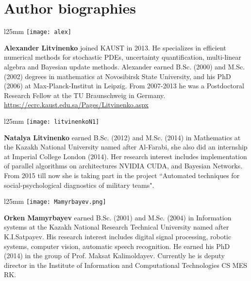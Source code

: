 \documentclass[12pt]{article}
\let\oldurl\url
\let\linkurl\url
\let\url\oldurl
\begin{document}
\section*{Author biographies}
\begin{wrapfigure}{l}{25mm} 
\texttt{[image: alex]}\end{wrapfigure}\par
{\bf Alexander Litvinenko} joined KAUST in 2013. He specializes in efficient numerical methods for stochastic PDEs, uncertainty quantification, multi-linear algebra and Bayesian update methods. Alexander earned B.Sc. (2000) and M.Sc. (2002) degrees in mathematics at Novosibirsk State University, and his PhD (2006) at Max-Planck-Institut in Leipzig. From 2007-2013 he was a Postdoctoral Research Fellow at the TU Braunschweig in Germany.\\
\linkurl{https://ecrc.kaust.edu.sa/Pages/Litvinenko.aspx}\\

\begin{wrapfigure}{l}{25mm} 
\texttt{[image: litvinenkoN1]}\end{wrapfigure}\par
{\bf Natalya Litvinenko} earned B.Sc. (2012) and M.Sc. (2014) in Mathematics at the Kazakh National University named after Al-Farabi, she also did an internship at Imperial College London (2014). Her research interest includes implementation of parallel algorithms on architectures NVIDIA CUDA, and Bayesian Networks. From 2015 till now she is taking part in the project ``Automated techniques for social-psychological diagnostics of military teams".\\

\begin{wrapfigure}{l}{25mm} 
\texttt{[image: Mamyrbayev.png]}\end{wrapfigure}\par
{\bf Orken Mamyrbayev} earned B.Sc. (2001) and M.Sc. (2004) in Information systems at the Kazakh National Research Technical University named after K.I.Satpayev. His research interest includes digital signal processing, robotic systems, computer vision, automatic speech recognition. He earned his PhD (2014) in the group of Prof. Maksat Kalimoldayev. Currently he is deputy director in the Institute of Information and Computational Technologies CS MES RK.
\end{document}

